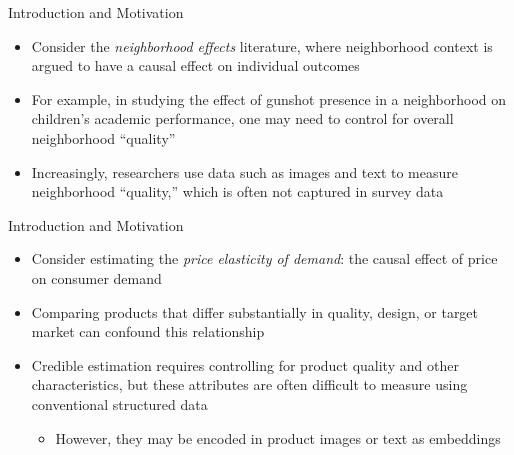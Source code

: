 \documentclass[aspectratio=1610,12pt,xcolor=dvipsnames]{beamer}
\makeatletter
\DeclareRobustCommand\citep
{\begingroup\scriptsize\color{gray}\NAT@swatrue\let\NAT@ctype\z@\NAT@partrue
    \@ifstar{\NAT@fulltrue\NAT@citetp}{\NAT@fullfalse\NAT@citetp}}
\makeatother
\begin{document}
\begin{frame}{Introduction and Motivation}

\begin{itemize}
    \item Consider the \textit{neighborhood effects} literature, where neighborhood context is argued to have a causal effect on individual outcomes
    \item For example, in studying the effect of gunshot presence in a neighborhood on children's academic performance, one may need to control for overall neighborhood ``quality''
    \item Increasingly, researchers use data such as images and text to measure neighborhood ``quality,'' which is often not captured in survey data
\end{itemize}
\end{frame}

\begin{frame}{Introduction and Motivation}

\begin{itemize}
    \item Consider estimating the \textit{price elasticity of demand}: the causal effect of price on consumer demand
    \item Comparing products that differ substantially in quality, design, or target market can confound this relationship
    \item Credible estimation requires controlling for product quality and other characteristics, but these attributes are often difficult to measure using conventional structured data \citep{bajari2025hedonic} \pause
    \begin{itemize}
        \item However, they may be encoded in product images or text as embeddings
    \end{itemize} 
\end{itemize}
    
\end{frame}
\end{document}
